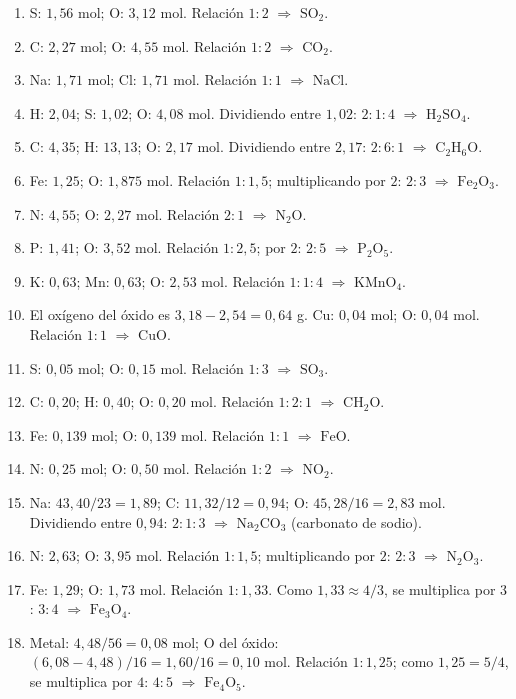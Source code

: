\documentclass[12pt, letterpaper]{article}
\begin{document}
  \begin{enumerate}[leftmargin=*, label=\textbf{\arabic*.}, start=30]
    \item S: $1{,}56$ mol; O: $3{,}12$ mol. Relación $1 : 2$ $\Rightarrow$ $\text{SO}_2$.
    \item C: $2{,}27$ mol; O: $4{,}55$ mol. Relación $1 : 2$ $\Rightarrow$ $\text{CO}_2$.
    \item Na: $1{,}71$ mol; Cl: $1{,}71$ mol. Relación $1 : 1$ $\Rightarrow$ $\text{NaCl}$.
    \item H: $2{,}04$; S: $1{,}02$; O: $4{,}08$ mol. Dividiendo entre $1{,}02$: $2 : 1 : 4$ $\Rightarrow$ $\text{H}_2\text{SO}_4$.
    \item C: $4{,}35$; H: $13{,}13$; O: $2{,}17$ mol. Dividiendo entre $2{,}17$: $2 : 6 : 1$ $\Rightarrow$ $\text{C}_2\text{H}_6\text{O}$.
    \item Fe: $1{,}25$; O: $1{,}875$ mol. Relación $1 : 1{,}5$; multiplicando por $2$: $2 : 3$ $\Rightarrow$ $\text{Fe}_2\text{O}_3$.
    \item N: $4{,}55$; O: $2{,}27$ mol. Relación $2 : 1$ $\Rightarrow$ $\text{N}_2\text{O}$.
    \item P: $1{,}41$; O: $3{,}52$ mol. Relación $1 : 2{,}5$; por $2$: $2 : 5$ $\Rightarrow$ $\text{P}_2\text{O}_5$.
    \item K: $0{,}63$; Mn: $0{,}63$; O: $2{,}53$ mol. Relación $1 : 1 : 4$ $\Rightarrow$ $\text{KMnO}_4$.
    \item El oxígeno del óxido es $3{,}18 - 2{,}54 = 0{,}64$ g. Cu: $0{,}04$ mol; O: $0{,}04$ mol. Relación $1 : 1$ $\Rightarrow$ $\text{CuO}$.
    \item S: $0{,}05$ mol; O: $0{,}15$ mol. Relación $1 : 3$ $\Rightarrow$ $\text{SO}_3$.
    \item C: $0{,}20$; H: $0{,}40$; O: $0{,}20$ mol. Relación $1 : 2 : 1$ $\Rightarrow$ $\text{CH}_2\text{O}$.
    \item Fe: $0{,}139$ mol; O: $0{,}139$ mol. Relación $1 : 1$ $\Rightarrow$ $\text{FeO}$.
    \item N: $0{,}25$ mol; O: $0{,}50$ mol. Relación $1 : 2$ $\Rightarrow$ $\text{NO}_2$.
    \item Na: $43{,}40/23 = 1{,}89$; C: $11{,}32/12 = 0{,}94$; O: $45{,}28/16 = 2{,}83$ mol. Dividiendo entre $0{,}94$: $2 : 1 : 3$ $\Rightarrow$ $\text{Na}_2\text{CO}_3$ (carbonato de sodio).
    \item N: $2{,}63$; O: $3{,}95$ mol. Relación $1 : 1{,}5$; multiplicando por $2$: $2 : 3$ $\Rightarrow$ $\text{N}_2\text{O}_3$.
    \item Fe: $1{,}29$; O: $1{,}73$ mol. Relación $1 : 1{,}33$. Como $1{,}33 \approx 4/3$, se multiplica por $3$: $3 : 4$ $\Rightarrow$ $\text{Fe}_3\text{O}_4$.
    \item Metal: $4{,}48/56 = 0{,}08$ mol; O del óxido: $(6{,}08-4{,}48)/16 = 1{,}60/16 = 0{,}10$ mol. Relación $1 : 1{,}25$; como $1{,}25 = 5/4$, se multiplica por $4$: $4 : 5$ $\Rightarrow$ $\text{Fe}_4\text{O}_5$.
  \end{enumerate}
\end{document}
